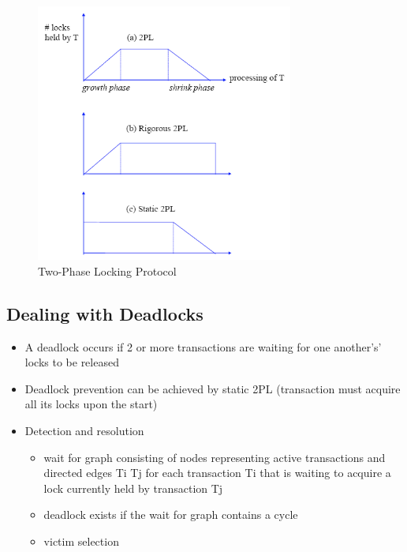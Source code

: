\documentclass{report}
\begin{document}
    \begin{figure}
        \includegraphics[width=240pt]{./images/2PL.png}
        \caption{\label{fig:2PL}Two-Phase Locking Protocol}
    \end{figure}
    \subsection{Dealing with Deadlocks}
    \begin{itemize}
        \item A deadlock occurs if 2 or more transactions are waiting for one another’s’ locks to be released
        \item Deadlock prevention can be achieved by static 2PL (transaction must acquire all its locks upon the start)
        \item Detection and resolution
        \begin{itemize}
            \item wait for graph consisting of nodes representing active transactions and directed edges Ti  \textrightarrow Tj for each transaction Ti that is waiting to acquire a lock currently held by transaction Tj
            \item deadlock exists if the wait for graph contains a cycle
            \item victim selection
        \end{itemize}
    \end{itemize}
\end{document}
